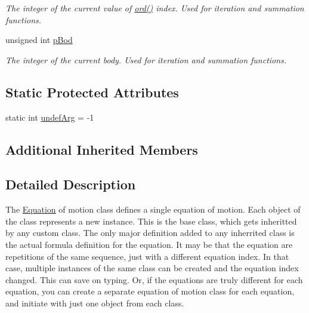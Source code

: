 \begin{DoxyCompactItemize}
\begin{DoxyCompactList}\small\item\em The integer of the current value of \hyperlink{classosea_1_1ofreq_1_1_equationof_motion_a31f904818ce75c9e2a2b5cff9fc707a5}{ord()} index. Used for iteration and summation functions. \end{DoxyCompactList}\item 
\hypertarget{classosea_1_1ofreq_1_1_equationof_motion_a5a1c11c4c4a827494a7772af0d0dddc6}{unsigned int \hyperlink{classosea_1_1ofreq_1_1_equationof_motion_a5a1c11c4c4a827494a7772af0d0dddc6}{p\-Bod}}\label{classosea_1_1ofreq_1_1_equationof_motion_a5a1c11c4c4a827494a7772af0d0dddc6}

\begin{DoxyCompactList}\small\item\em The integer of the current body. Used for iteration and summation functions. \end{DoxyCompactList}\end{DoxyCompactItemize}
\subsection*{Static Protected Attributes}
\begin{DoxyCompactItemize}
\item 
static int \hyperlink{classosea_1_1ofreq_1_1_equationof_motion_ad00063eabf1b5075b04c6d2507acebd4}{undef\-Arg} = -\/1
\end{DoxyCompactItemize}
\subsection*{Additional Inherited Members}


\subsection{Detailed Description}
The \hyperlink{classosea_1_1ofreq_1_1_equation}{Equation} of motion class defines a single equation of motion. Each object of the class represents a new instance. This is the base class, which gets inheritted by any custom class. The only major definition added to any inherrited class is the actual formula definition for the equation. It may be that the equation are repetitions of the same sequence, just with a different equation index. In that case, multiple instances of the same class can be created and the equation index changed. This can save on typing. Or, if the equations are truly different for each equation, you can create a separate equation of motion class for each equation, and initiate with just one object from each class.

